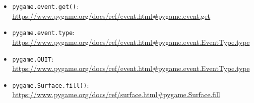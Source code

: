 \begin{itemize}
	\item \texttt{pygame.event.get()}:
	\\
	\url{https://www.pygame.org/docs/ref/event.html#pygame.event.get}
	
	\item \texttt{pygame.event.type}:
	\\
	\url{https://www.pygame.org/docs/ref/event.html#pygame.event.EventType.type}
	
	\item \texttt{pygame.QUIT}:
	\\
	\url{https://www.pygame.org/docs/ref/event.html#pygame.event.EventType.type}
	
	\item \texttt{pygame.Surface.fill()}:
	\\
	\url{https://www.pygame.org/docs/ref/surface.html#pygame.Surface.fill}
\end{itemize}

